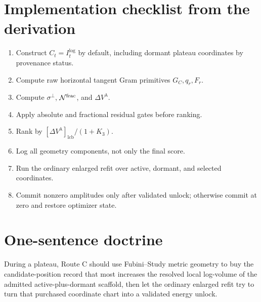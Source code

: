 \documentclass[10pt,twocolumn]{article}
\newcommand{\lcb}{\mathrm{lcb}}
\newcommand{\logi}{\mathrm{log}}
\begin{document}
\section{Implementation checklist from the derivation}

\begin{enumerate}
\item Construct $C_t=I_t^{\logi}$ by default, including dormant plateau
coordinates by provenance status.
\item Compute raw horizontal tangent Gram primitives $G_C,q_r,F_r$.
\item Compute $\sigma^\perp$, $\mathcal N^{\rm frac}$, and
$\Delta V^\lambda$.
\item Apply absolute and fractional residual gates before ranking.
\item Rank by $[\Delta V^\lambda]_{\lcb}/(1+K_3)$.
\item Log all geometry components, not only the final score.
\item Run the ordinary enlarged refit over active, dormant, and selected
coordinates.
\item Commit nonzero amplitudes only after validated unlock; otherwise commit
at zero and restore optimizer state.
\end{enumerate}

\section{One-sentence doctrine}

During a plateau, Route C should use Fubini--Study metric geometry to buy the
candidate-position record that most increases the resolved local log-volume of
the admitted active-plus-dormant scaffold, then let the ordinary enlarged refit
try to turn that purchased coordinate chart into a validated energy unlock.
\end{document}
